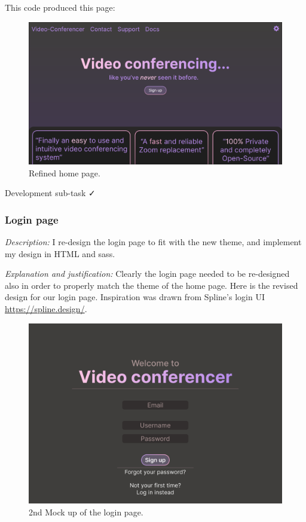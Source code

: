 This code produced this page:

\begin{figure}[H]
\centering

\includegraphics[scale=0.2]{Images/Refined_home.png}

\caption{Refined home page.}
\end{figure}

{\color{gray} \hrulefill} \vspace{0.2cm}

{\sffamily Development sub-task  \faCheck}

\subsubsection{Login page}

\textit{Description:} I re-design the login page to fit with the
new theme, and implement my design in HTML and sass.\\ \vspace{0.2cm}

\textit{Explanation and justification:}
Clearly the login page needed to be re-designed also in order
to properly match the theme of the home page. Here is the
revised design for our login page. Inspiration was drawn
from Spline's login UI \url{https://spline.design/}.

\begin{figure}[H]
\centering

\includegraphics[scale=0.2]{Images/Login_Page_2.png}

\caption{2nd Mock up of the login page.}
\end{figure}

